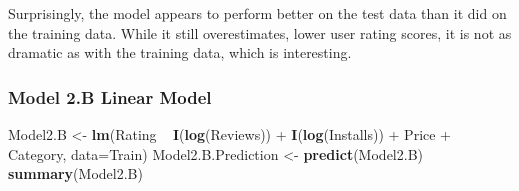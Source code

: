 \documentclass[]{article}
\newenvironment{Shaded}{\begin{snugshade}}{\end{snugshade}}
\newcommand{\KeywordTok}[1]{\textcolor[rgb]{0.13,0.29,0.53}{\textbf{{#1}}}}
\newcommand{\DataTypeTok}[1]{\textcolor[rgb]{0.13,0.29,0.53}{{#1}}}
\newcommand{\StringTok}[1]{\textcolor[rgb]{0.31,0.60,0.02}{{#1}}}
\newcommand{\NormalTok}[1]{{#1}}
\begin{document}
Surprisingly, the model appears to perform better on the test data than
it did on the training data. While it still overestimates, lower user
rating scores, it is not as dramatic as with the training data, which is
interesting.

\subsubsection{Model 2.B Linear Model}\label{model-2.b-linear-model}

\begin{Shaded}
\begin{Highlighting}[]
\NormalTok{Model2.B <-}\StringTok{ }\KeywordTok{lm}\NormalTok{(Rating ~}\StringTok{ }\KeywordTok{I}\NormalTok{(}\KeywordTok{log}\NormalTok{(Reviews)) +}\StringTok{ }\KeywordTok{I}\NormalTok{(}\KeywordTok{log}\NormalTok{(Installs)) +}\StringTok{ }\NormalTok{Price +}\StringTok{ }\NormalTok{Category, }\DataTypeTok{data=}\NormalTok{Train)}
\NormalTok{Model2.B.Prediction <-}\StringTok{ }\KeywordTok{predict}\NormalTok{(Model2.B)}
\KeywordTok{summary}\NormalTok{(Model2.B)}
\end{Highlighting}
\end{Shaded}
\end{document}
